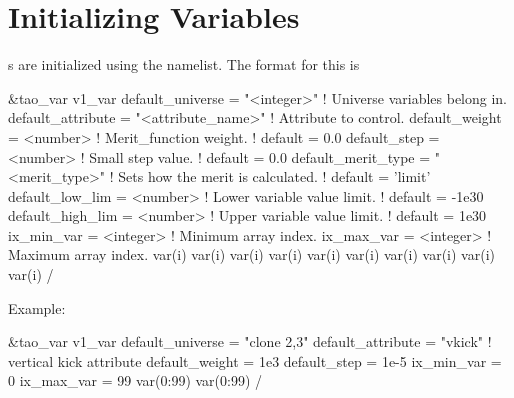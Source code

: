 {{{{{{{{{{{{{{{{{{%
\section{Initializing Variables}
\label{s:init_var} 

s are initialized using the  namelist. The
format for this is
\begin{example}
  &tao_var
    v1_var%
    default_universe   = "<integer>"         ! Universe variables belong in.
    default_attribute  = "<attribute_name>"  ! Attribute to control.
    default_weight     = <number>            ! Merit_function weight.
                                             ! default = 0.0
    default_step       = <number>            ! Small step value.
                                             ! default = 0.0
    default_merit_type = "<merit_type>"      ! Sets how the merit is calculated.
                                             ! default = 'limit'
    default_low_lim    = <number>            ! Lower variable value limit. 
                                             ! default = -1e30
    default_high_lim   = <number>            ! Upper variable value limit. 
                                             ! default =  1e30
    ix_min_var         = <integer>           ! Minimum array index.
    ix_max_var         = <integer>           ! Maximum array index.
    var(i)%
    var(i)%
    var(i)%
    var(i)%
    var(i)%
    var(i)%
    var(i)%
    var(i)%
    var(i)%
    var(i)%
  /
\end{example}
Example:
\begin{example}
  &tao_var
    v1_var%
    default_universe  = "clone 2,3"
    default_attribute = "vkick"     ! vertical kick attribute
    default_weight    = 1e3
    default_step      = 1e-5
    ix_min_var        = 0
    ix_max_var        = 99
    var(0:99)%
    var(0:99)%
  /
\end{example}

}}}}}}}}}}}}}}}}}}
